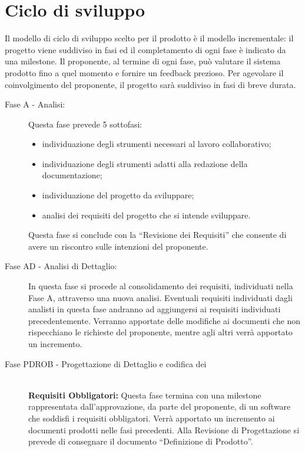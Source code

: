 \documentclass[../PianoProgetto.tex]{subfiles}
\begin{document}
\section{Ciclo di sviluppo}

	Il modello di ciclo di sviluppo scelto per il prodotto è il modello incrementale: il progetto viene suddiviso in fasi ed il completamento di ogni fase è indicato da una milestone.
	Il proponente, al termine di ogni fase, può valutare il sistema prodotto fino a quel momento e fornire un feedback prezioso.
	Per agevolare il coinvolgimento del proponente, il progetto sarà suddiviso in fasi di breve durata.
	\begin{description}
	
	\item[Fase A - Analisi:] Questa fase prevede 5 sottofasi:
		\begin{itemize}
		\item individuazione degli strumenti necessari al lavoro collaborativo;
		\item individuazione degli strumenti adatti alla redazione della documentazione;
		\item individuazione del progetto da sviluppare;
		\item analisi dei requisiti del progetto che si intende sviluppare.
		\end{itemize}
		Questa fase si conclude con la “Revisione dei Requisiti” che consente di avere un riscontro sulle intenzioni del proponente.


	\item[Fase AD - Analisi di Dettaglio:] In questa fase si procede al consolidamento dei requisiti, individuati nella Fase A, attraverso una nuova analisi.
		Eventuali requisiti individuati dagli analisti in questa fase andranno ad aggiungersi ai requisiti individuati precedentemente. 
		Verranno apportate delle modifiche ai documenti che non rispecchiano le richieste del proponente, mentre agli altri verrà apportato un incremento.


	\item[Fase PDROB - Progettazione di Dettaglio e codifica dei] \ \\
		\textbf{ Requisiti Obbligatori:}
		Questa fase termina con una milestone rappresentata dall’approvazione, da parte del proponente, di un software che soddisfi i requisiti obbligatori.
		Verrà apportato un incremento ai documenti prodotti nelle fasi precedenti.
		Alla Revisione di Progettazione si prevede di consegnare il documento “Definizione di Prodotto”.
  

\end{description}
\end{document}
